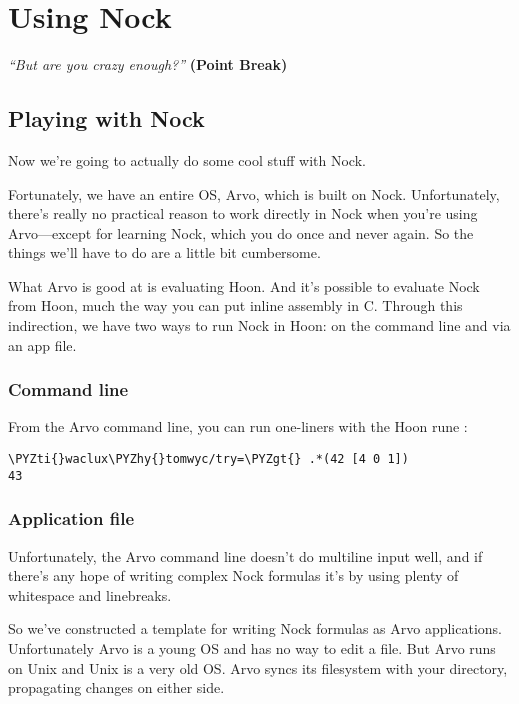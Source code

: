 \chapter{Using Nock}

\emph{``But are you crazy enough?''}
\textbf{(Point Break)}

\section{Playing with Nock}

Now we're going to actually do some cool stuff with Nock.

Fortunately, we have an entire OS, Arvo, which is built on Nock.
Unfortunately, there's really no practical reason to work
directly in Nock when you're using Arvo---except for learning
Nock, which you do once and never again.  So the things we'll
have to do are a little bit cumbersome.

What Arvo is good at is evaluating Hoon.  And it's possible to
evaluate Nock from Hoon, much the way you can put inline assembly
in C.  Through this indirection, we have two ways to run Nock in
Hoon: on the command line and via an app file.

\subsection{Command line}

From the Arvo command line, you can run one-liners with the Hoon
rune :

\begin{framed_shaded}
\begin{Verbatim}[fontsize=\relsize{-2.5},fontseries=b,commandchars=\\\{\}]
\PYZti{}waclux\PYZhy{}tomwyc/try=\PYZgt{} .*(42 [4 0 1])
43
\end{Verbatim}
\end{framed_shaded}

\subsection{Application file}

Unfortunately, the Arvo command line doesn't do multiline input
well, and if there's any hope of writing complex Nock formulas
it's by using plenty of whitespace and linebreaks.

So we've constructed a template for writing Nock formulas as Arvo
applications.  Unfortunately Arvo is a young OS and has no way to
edit a file.  But Arvo runs on Unix and Unix is a very old OS.
Arvo syncs its filesystem with your  directory,
propagating changes on either side.


